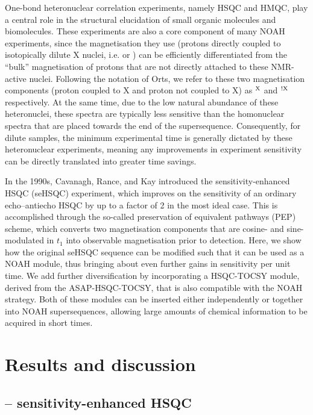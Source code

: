 \documentclass[final,twocolumn]{elsarticle}
\newcommand*{\carbon}{\ce{^{13}C}}
\newcommand*{\proton}{\ce{^{1}H}}
\newcommand*{\nitrogen}{\ce{^{15}N}}
\newcommand*{\magn}[1]{\ce{^1H}$^{#1}$}
\newcommand*{\magnnot}[1]{\ce{^1H}$^{!#1}$}
\begin{document}
One-bond heteronuclear correlation experiments, namely HSQC and HMQC, play a central role in the structural elucidation of small organic molecules and biomolecules.\cite{Claridge2016, Cavanagh2007}
These experiments are also a core component of many NOAH experiments, since the magnetisation they use (protons directly coupled to isotopically dilute X nuclei, i.e. \carbon{} or \nitrogen{}) can be efficiently differentiated from the ``bulk'' magnetisation of protons that are not directly attached to these NMR-active nuclei.\cite{Garbow1982CPL, Wimperis1984JMR, Uhrin1993JMRSA, Sorensen1994BMR, Briand1997JMR, Briand1998JMR}
Following the notation of Orts,\cite{Orts2018M} we refer to these two magnetisation components (proton coupled to X and proton not coupled to X) as \magn{\ce{X}} and \magnnot{\ce{X}} respectively.
At the same time, due to the low natural abundance of these heteronuclei, these spectra are typically less sensitive than the homonuclear spectra that are placed towards the end of the supersequence.
Consequently, for dilute samples, the minimum experimental time is generally dictated by these heteronuclear experiments, meaning any improvements in experiment sensitivity can be directly translated into greater time savings.

In the 1990s, Cavanagh, Rance, and Kay introduced the sensitivity-enhanced HSQC (seHSQC) experiment,\cite{Palmer1991JMR, Kay1992JACS} which improves on the sensitivity of an ordinary echo--antiecho HSQC by up to a factor of 2 in the most ideal case.
This is accomplished through the so-called preservation of equivalent pathways (PEP) scheme, which converts two magnetisation components that are cosine- and sine-modulated in $t_1$ into observable magnetisation prior to detection.\cite{Cavanagh1990JMR, Cavanagh1993ARNMRS}
Here, we show how the original seHSQC sequence can be modified such that it can be used as a NOAH module, thus bringing about even further gains in sensitivity per unit time.
We add further diversification by incorporating a HSQC-TOCSY module, derived from the ASAP-HSQC-TOCSY,\cite{Becker2019JMR} that is also compatible with the NOAH strategy.
Both of these modules can be inserted either independently or together into NOAH supersequences, allowing large amounts of chemical information to be acquired in short times.
\section{Results and discussion}
\subsection{\proton{}--\carbon{} sensitivity-enhanced HSQC}
\end{document}
